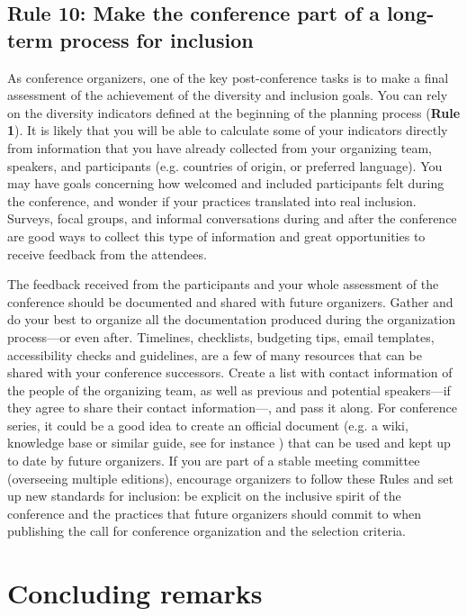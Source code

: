 \documentclass[10pt,letterpaper]{article}
\begin{document}
\subsection*{Rule 10: Make the conference part of a long-term process for inclusion}
\label{rule_process}

As conference organizers, one of the key post-conference tasks is to make a final assessment of the achievement of the diversity and inclusion goals. 
You can rely on the diversity indicators defined at the beginning of the planning process (\textbf{Rule 1}). 
It is likely that you will be able to calculate some of your indicators directly from information that you have already collected from your organizing team, speakers, and participants (e.g. countries of origin, or preferred language).
You may have goals concerning how welcomed and included participants felt during the conference, and wonder if your practices translated into real inclusion. Surveys, focal groups, and informal conversations during and after the conference are good ways to collect this type of information and great opportunities to receive feedback from the attendees. 

The feedback received from the participants and your whole assessment of the conference should be documented and shared with future organizers. 
Gather and do your best to organize all the documentation produced during the organization process—or even after. Timelines, checklists, budgeting tips, email templates, accessibility checks and guidelines, are a few of many resources that can be shared with your conference successors. 
Create a list with contact information of the people of the organizing team, as well as previous and potential speakers—if they agree to share their contact information—, and pass it along.
For conference series, it could be a good idea to create an official document (e.g. a wiki, knowledge base or similar guide, see for instance \cite{sanchez-tapia_user_2021-2}) that can be used and kept up to date by future organizers.
If you are part of a stable meeting committee (overseeing multiple editions), encourage organizers to follow these Rules and set up new standards for inclusion: be explicit on the inclusive spirit of the conference and the practices that future organizers should commit to when publishing the call for conference organization and the selection criteria. 


\section*{Concluding remarks}
\end{document}
